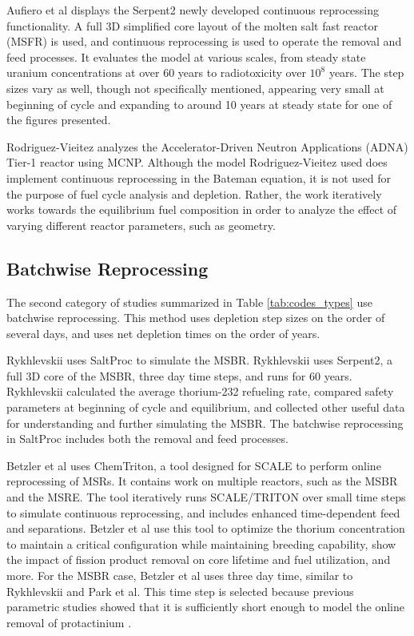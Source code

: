Aufiero et al \cite{aufiero_extended_2013} displays the Serpent2 newly developed continuous reprocessing functionality. A full 3D simplified core layout of the molten salt fast reactor (MSFR) is used, and continuous reprocessing is used to operate the removal and feed processes. It evaluates the model at various scales, from steady state uranium concentrations at over 60 years to radiotoxicity over $10^8$ years. The step sizes vary as well, though not specifically mentioned, appearing very small at beginning of cycle and expanding to around 10 years at steady state for one of the figures presented.

Rodriguez-Vieitez \cite{rodriguez-vieitez_transmutation_2002} analyzes the Accelerator-Driven Neutron Applications (ADNA) Tier-1 reactor using MCNP. Although the model Rodriguez-Vieitez used does implement continuous reprocessing in the Bateman equation, it is not used for the purpose of fuel cycle analysis and depletion. Rather, the work iteratively works towards the equilibrium fuel composition in order to analyze the effect of varying different reactor parameters, such as geometry.

\subsection{Batchwise Reprocessing}
\label{litrev-msr-batchwise}

The second category of studies summarized in Table \ref{tab:codes_types} use batchwise reprocessing. This method uses depletion step sizes on the order of several days, and uses net depletion times on the order of years.

Rykhlevskii \cite{rykhlevskii_modeling_2019} uses SaltProc to simulate the MSBR. Rykhlevskii uses Serpent2, a full 3D core of the MSBR, three day time steps, and runs for 60 years.
Rykhlevskii calculated the average thorium-232 refueling rate, compared safety parameters at beginning of cycle and equilibrium, and collected other useful data for understanding and further simulating the MSBR.
The batchwise reprocessing in SaltProc includes both the removal and feed processes.

Betzler et al \cite{betzler_molten_2017} uses ChemTriton, a tool designed for SCALE to perform online reprocessing of MSRs. It contains work on multiple reactors, such as the MSBR and the MSRE. The tool iteratively runs SCALE/TRITON over small time steps to simulate continuous reprocessing, and includes enhanced time-dependent feed and separations.
Betzler et al use this tool to optimize the thorium concentration to maintain a critical configuration while maintaining breeding capability, show the impact of fission product removal on core lifetime and fuel utilization, and more.
For the MSBR case, Betzler et al uses three day time, similar to Rykhlevskii and Park et al.
This time step is selected because previous parametric studies showed that it is sufficiently short enough to model the online removal of protactinium \cite{powers_new_2013}.

